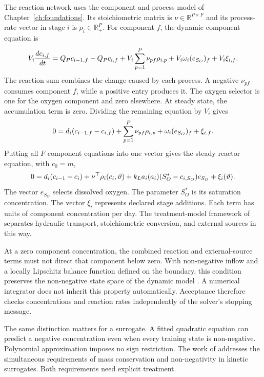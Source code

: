 The reaction network uses the component and process model of Chapter~\ref{ch:foundations}. Its stoichiometric matrix is $\nu\in\mathbb R^{P\times F}$ and its process-rate vector in stage $i$ is $\rho_i\in\mathbb R_+^P$. For component $f$, the dynamic component equation is
\begin{equation}
\equationname{Dynamic reactor-stage equation for one component}
V_i\frac{dc_{i,f}}{dt}=Q_Pc_{i-1,f}-Q_Pc_{i,f}
+V_i\sum_{p=1}^{P}\nu_{pf}\rho_{i,p}+V_i\omega_i(e_{S_O})_f+V_i\xi_{i,f}.
\end{equation}
The reaction sum combines the change caused by each process. A negative $\nu_{pf}$ consumes component $f$, while a positive entry produces it. The oxygen selector is one for the oxygen component and zero elsewhere. At steady state, the accumulation term is zero. Dividing the remaining equation by $V_i$ gives
\begin{equation}
\equationname{Steady-state reactor-stage equation for one component}
0=d_i(c_{i-1,f}-c_{i,f})+\sum_{p=1}^{P}\nu_{pf}\rho_{i,p}
+\omega_i(e_{S_O})_f+\xi_{i,f}.
\end{equation}
Putting all $F$ component equations into one vector gives the steady reactor equation, with $c_0=m$,
\begin{equation}
\equationname{Vector reactor-stage equation with aeration and external additions}
0=d_i(c_{i-1}-c_i)+\nu^\top\rho_i(c_i,\vartheta)
+k_La_i(a_i)(S_O^*-c_{i,S_O})e_{S_O}+\xi_i(\vartheta).
\label{eq:plant_reactor}
\end{equation}
The vector $e_{S_O}$ selects dissolved oxygen. The parameter $S_O^*$ is its saturation concentration. The vector $\xi_i$ represents declared stage additions. Each term has units of component concentration per day. The treatment-model framework of \citet{Henze2006} separates hydraulic transport, stoichiometric conversion, and external sources in this way.

At a zero component concentration, the combined reaction and external-source terms must not direct that component below zero. With non-negative inflow and a locally Lipschitz balance function defined on the boundary, this condition preserves the non-negative state space of the dynamic model \citep{Haddad2010}. A numerical integrator does not inherit this property automatically. Acceptance therefore checks concentrations and reaction rates independently of the solver's stopping message.

The same distinction matters for a surrogate. A fitted quadratic equation can predict a negative concentration even when every training state is non-negative. Polynomial approximation imposes no sign restriction. The work of \citet{KircherVotsmeier2025} addresses the simultaneous requirements of mass conservation and non-negativity in kinetic surrogates. Both requirements need explicit treatment.

